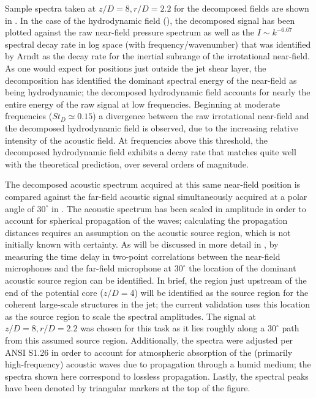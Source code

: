 Sample spectra taken at $z/D = 8, r/D = 2.2$ for the decomposed fields are shown in .
In the case of the hydrodynamic field (), the decomposed signal has been plotted against the raw near-field pressure spectrum as well as the $I \sim k^{-6.67}$ spectral decay rate in log space (with frequency/wavenumber) that was identified by Arndt \etal \citep{Arndt1997} as the decay rate for the inertial subrange of the irrotational near-field.
As one would expect for positions just outside the jet shear layer, the decomposition has identified the dominant spectral energy of the near-field as being hydrodynamic; the decomposed hydrodynamic field accounts for nearly the entire energy of the raw signal at low frequencies.
Beginning at moderate frequencies ($St_D \simeq 0.15$) a divergence between the raw irrotational near-field and the decomposed hydrodynamic field is observed, due to the increasing relative intensity of the acoustic field.
At frequencies above this threshold, the decomposed hydrodynamic field exhibits a decay rate that matches quite well with the theoretical prediction, over several orders of magnitude. 

The decomposed acoustic spectrum acquired at this same near-field position is compared against the far-field acoustic signal simultaneously acquired at a polar angle of $30^\circ$ in .
The acoustic spectrum has been scaled in amplitude in order to account for spherical propagation of the waves; calculating the propagation distances requires an assumption on the acoustic source region, which is not initially known with certainty.
As will be discussed in more detail in , by measuring the time delay in two-point correlations between the near-field microphones and the far-field microphone at $30^\circ$ the location of the dominant acoustic source region can be identified. 
In brief, the region just upstream of the end of the potential core ($z/D =4$) will be identified as the source region for the coherent large-scale structures in the jet; the current validation uses this location as the source region to scale the spectral amplitudes.
The signal at $z/D = 8, r/D = 2.2$ was chosen for this task as it lies roughly along a $30^\circ$ path from this assumed source region.
Additionally, the spectra were adjusted per ANSI S1.26 \citep{ANS1995} in order to account for atmospheric absorption of the (primarily high-frequency) acoustic waves due to propagation through a humid medium; the spectra shown here correspond to lossless propagation.
Lastly, the spectral peaks have been denoted by triangular markers at the top of the figure. 

